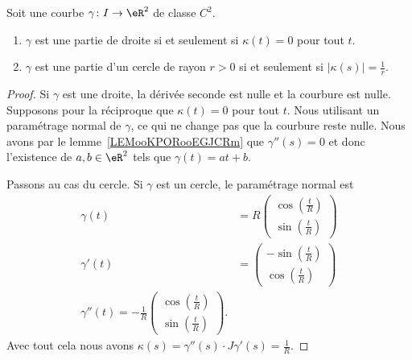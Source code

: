 \begin{theorem}     \label{THOooDLDVooFQnLWn}
	Soit une courbe \( \gamma\colon I\to \eR^2\) de classe \( C^2\).
	\begin{enumerate}
		\item
		      \( \gamma\) est une partie de droite si et seulement si \( \kappa(t)=0\) pour tout \( t\).
		\item
		      \( \gamma\) est une partie d'un cercle de rayon \( r>0\) si et seulement si \( | \kappa(s) |=\frac{1}{ r }\).
	\end{enumerate}
\end{theorem}

\begin{proof}
	Si \( \gamma\) est une droite, la dérivée seconde est nulle et la courbure est nulle. Supposons pour la réciproque que \( \kappa(t)=0\) pour tout \( t\). Nous utilisant un paramétrage normal de \( \gamma\), ce qui ne change pas que la courbure reste nulle. Nous avons par le lemme~\ref{LEMooKPORooEGJCRm} que \( \gamma''(s)=0\) et donc l'existence de \( a,b\in \eR^2\) tels que \( \gamma(t)=at+b\).

	Passons au cas du cercle. Si \( \gamma\) est un cercle, le paramétrage normal est
	\begin{subequations}
		\begin{align}
			\gamma(t)  & =R\begin{pmatrix}
				               \cos(\frac{ t }{ R }) \\
				               \sin(\frac{ t }{ R })
			               \end{pmatrix} \\
			\gamma'(t) & =\begin{pmatrix}
				              -\sin(\frac{ t }{ R }) \\
				              \cos(\frac{ t }{ R })
			              \end{pmatrix} \\
			\gamma''(t)=-\frac{1}{ R }\begin{pmatrix}
				                          \cos(\frac{ t }{ R }) \\
				                          \sin(\frac{ t }{ R })
			                          \end{pmatrix}.
		\end{align}
	\end{subequations}
	Avec tout cela nous avons \( \kappa(s)=\gamma''(s)\cdot J\gamma'(s)=\frac{1}{ R }\).


\end{proof}
